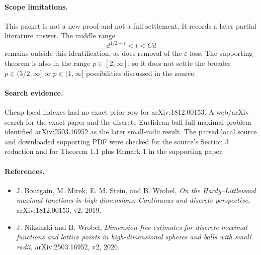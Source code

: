\documentclass[11pt]{article}
\begin{document}
\paragraph{Scope limitations.}
This packet is not a new proof and not a full settlement.  It records a later
partial literature answer.  The middle range
\[
d^{1/2-\varepsilon}<t<Cd
\]
remains outside this identification, as does removal of the \(\varepsilon\)
loss.  The supporting theorem is also in the range \(p\in[2,\infty]\), so it
does not settle the broader \(p\in(3/2,\infty]\) or \(p\in(1,\infty]\)
possibilities discussed in the source.

\paragraph{Search evidence.}
Cheap local indexes had no exact prior row for arXiv:1812.00153.  A web/arXiv
search for the exact paper and the discrete Euclidean-ball full maximal problem
identified arXiv:2503.16952 as the later small-radii result.  The parsed local
source and downloaded supporting PDF were checked for the source's Section 3
reduction and for Theorem 1.1 plus Remark 1 in the supporting paper.

\paragraph{References.}
\begin{itemize}
\item J. Bourgain, M. Mirek, E. M. Stein, and B. Wrobel, \emph{On the
Hardy--Littlewood maximal functions in high dimensions: Continuous and discrete
perspective}, arXiv:1812.00153, v2, 2019.
\item J. Niksinski and B. Wrobel, \emph{Dimension-free estimates for discrete
maximal functions and lattice points in high-dimensional spheres and balls with
small radii}, arXiv:2503.16952, v2, 2026.
\end{itemize}
\end{document}
